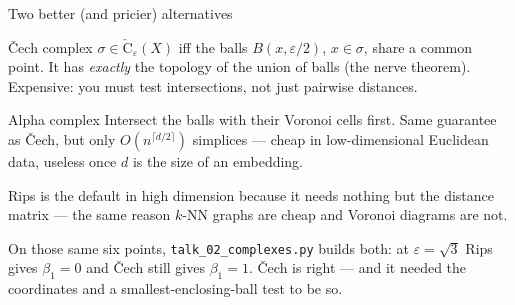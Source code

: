 \documentclass[10pt,aspectratio=169]{beamer}
\newcommand{\Cechsym}{\check{\mathrm{C}}}
\begin{document}
    \begin{frame}{Two better (and pricier) alternatives}
        \small
        \begin{block}{\v{C}ech complex}
            $\sigma\in\Cechsym_\varepsilon(X)$ iff the balls $B(x,\varepsilon/2)$, $x\in\sigma$,
            share a common point. It has \emph{exactly} the topology of the union of balls
            (the nerve theorem). Expensive: you must test intersections, not just pairwise
            distances.
        \end{block}
        \begin{block}{Alpha complex}
            Intersect the balls with their Voronoi cells first. Same guarantee as \v{C}ech, but
            only $O(n^{\lceil d/2\rceil})$ simplices --- cheap in low-dimensional Euclidean data,
            useless once $d$ is the size of an embedding.
        \end{block}
        \vspace{0.3em}

        \begin{center}
            \alert{Rips is the default in high dimension because it needs nothing but the
            distance matrix} --- the same reason $k$-NN graphs are cheap and Voronoi diagrams
            are not.
        \end{center}
        \vspace{0.2em}
        {\scriptsize On those same six points, \texttt{talk\_02\_complexes.py} builds
        both: at $\varepsilon=\sqrt3$ Rips gives $\beta_1=0$ and \v{C}ech still gives
            $\beta_1=1$. \v{C}ech is right --- and it needed the coordinates and a
        smallest-enclosing-ball test to be so.\par}
    \end{frame}
\end{document}
